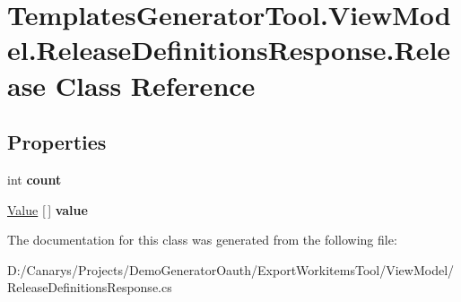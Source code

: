 \hypertarget{class_templates_generator_tool_1_1_view_model_1_1_release_definitions_response_1_1_release}{}\section{Templates\+Generator\+Tool.\+View\+Model.\+Release\+Definitions\+Response.\+Release Class Reference}
\label{class_templates_generator_tool_1_1_view_model_1_1_release_definitions_response_1_1_release}
\subsection*{Properties}
\begin{DoxyCompactItemize}
\item 
\mbox{\label{class_templates_generator_tool_1_1_view_model_1_1_release_definitions_response_1_1_release_a7f4e5dc8f96e1441fc0958660704a545}} 
int {\bfseries count}
\item 
\mbox{\label{class_templates_generator_tool_1_1_view_model_1_1_release_definitions_response_1_1_release_aff71f503069d0f9c57f01cf0a80dec14}} 
\mbox{\hyperlink{class_templates_generator_tool_1_1_view_model_1_1_release_definitions_response_1_1_value}{Value}} \mbox{[}$\,$\mbox{]} {\bfseries value}
\end{DoxyCompactItemize}


The documentation for this class was generated from the following file\+:\begin{DoxyCompactItemize}
\item 
D\+:/\+Canarys/\+Projects/\+Demo\+Generator\+Oauth/\+Export\+Workitems\+Tool/\+View\+Model/Release\+Definitions\+Response.\+cs\end{DoxyCompactItemize}

